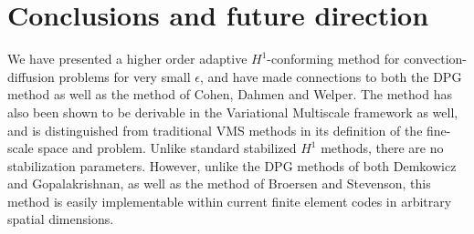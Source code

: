 \documentclass[final,leqno]{siamltex}
\begin{document}
%
%
%
%
%

\section{Conclusions and future direction}

We have presented a higher order adaptive $H^1$-conforming method for convection-diffusion problems for very small $\epsilon$, and have made connections to both the DPG method as well as the method of Cohen, Dahmen and Welper.  The method has also been shown to be derivable in the Variational Multiscale framework as well, and is distinguished from traditional VMS methods in its definition of the fine-scale space and problem.  Unlike standard stabilized $H^1$ methods, there are no stabilization parameters.  However, unlike the DPG methods of both Demkowicz and Gopalakrishnan, as well as the method of Broersen and Stevenson, this method is easily implementable within current finite element codes in arbitrary spatial dimensions.
\end{document}

